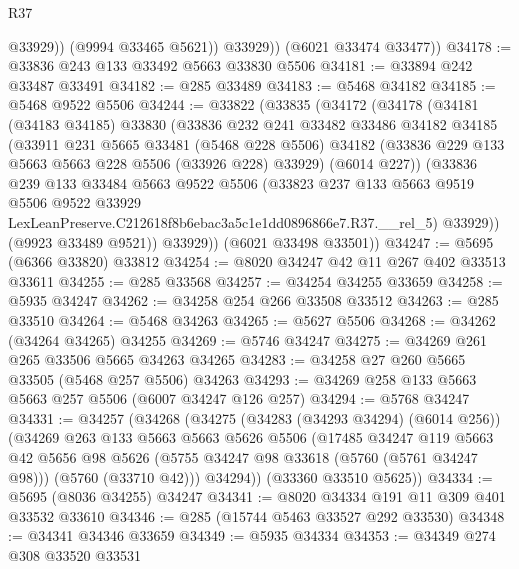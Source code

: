 \begin{lexlean}{R37}
\begin{coremodule}
                @33929))
            (@9994 @33465 @5621))
          @33929))
      (@6021 @33474 @33477))
@34178 := @33836 @243 @133 @33492 @5663 @33830 @5506
@34181 := @33894 @242 @33487 @33491
@34182 := @285 @33489
@34183 := @5468 @34182
@34185 := @5468 @9522 @5506
@34244 := @33822
    (@33835
      (@34172
        (@34178
          (@34181
            (@34183 @34185)
            @33830
            (@33836
              @232
              @241
              @33482
              @33486
              @34182
              @34185
              (@33911
                @231
                @5665
                @33481
                (@5468 @228 @5506)
                @34182
                (@33836 @229 @133 @5663 @5663 @228 @5506 (@33926 @228) @33929)
                (@6014 @227))
              (@33836
                @239
                @133
                @33484
                @5663
                @9522
                @5506
                (@33823
                  @237
                  @133
                  @5663
                  @9519
                  @5506
                  @9522
                  @33929
                  LexLeanPreserve.C212618f8b6ebac3a5c1e1dd0896866e7.R37.__rel_5)
                @33929))
            (@9923 @33489 @9521))
          @33929))
      (@6021 @33498 @33501))
@34247 := @5695 (@6366 @33820) @33812
@34254 := @8020 @34247 @42 @11 @267 @402 @33513 @33611
@34255 := @285 @33568
@34257 := @34254 @34255 @33659
@34258 := @5935 @34247
@34262 := @34258 @254 @266 @33508 @33512
@34263 := @285 @33510
@34264 := @5468 @34263
@34265 := @5627 @5506
@34268 := @34262 (@34264 @34265) @34255
@34269 := @5746 @34247
@34275 := @34269 @261 @265 @33506 @5665 @34263 @34265
@34283 := @34258 @27 @260 @5665 @33505 (@5468 @257 @5506) @34263
@34293 := @34269 @258 @133 @5663 @5663 @257 @5506 (@6007 @34247 @126 @257)
@34294 := @5768 @34247
@34331 := @34257
    (@34268
      (@34275
        (@34283 (@34293 @34294) (@6014 @256))
        (@34269
          @263
          @133
          @5663
          @5663
          @5626
          @5506
          (@17485
            @34247
            @119
            @5663
            @42
            @5656
            @98
            @5626
            (@5755 @34247 @98 @33618 (@5760 (@5761 @34247 @98)))
            (@5760 (@33710 @42)))
          @34294))
      (@33360 @33510 @5625))
@34334 := @5695 (@8036 @34255) @34247
@34341 := @8020 @34334 @191 @11 @309 @401 @33532 @33610
@34346 := @285 (@15744 @5463 @33527 @292 @33530)
@34348 := @34341 @34346 @33659
@34349 := @5935 @34334
@34353 := @34349 @274 @308 @33520 @33531

\end{coremodule}
\end{lexlean}
